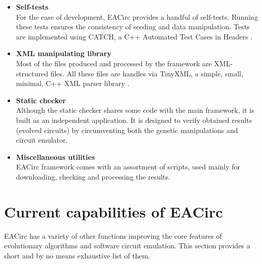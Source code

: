 \documentclass[12pt,oneside]{fithesis2}
\begin{document}
\begin{itemize}
\item \textbf{Self-tests}\\
For the ease of development, EACirc provides a handful of self-tests. Running these tests ensures the consistency
of seeding and data manipulation. Tests are implemented using CATCH, a C++ Automated Test Cases in Headers \cite{catch}.
\item \textbf{XML manipulating library}\\
Most of the files produced and processed by the framework are XML-structured files. All these files are handles via
TinyXML, a simple, small, minimal, C++ XML parser library \cite{tinyxml}.
\item \textbf{Static checker}\\
Although the static checker shares some code with the main framework, it is built as an independent application.
It is designed to verify obtained results (evolved circuits) by circumventing both the genetic manipulations and circuit emulator.
\item \textbf{Miscellaneous utilities}\\
EACirc framework comes with an assortment of scripts, used mainly for downloading, checking and processing the results.
\end{itemize}

\section{Current capabilities of EACirc}
\label{sec:eacirc-capabilities}

EACirc has a variety of other functions improving the core features of evolutionary algorithms and software circuit emulation.
This section provides a short and by no means exhaustive list of them.
\end{document}
